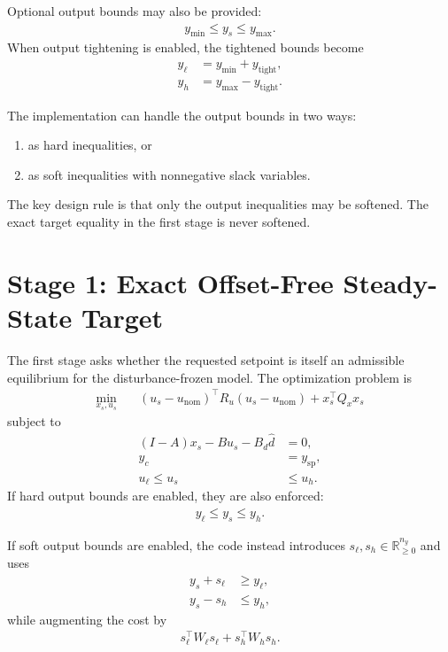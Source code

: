 \documentclass[11pt]{article}
\newcommand{\R}{\mathbb{R}}
\newcommand{\xs}{x_s}
\newcommand{\us}{u_s}
\newcommand{\ysp}{y_{\mathrm{sp}}}
\newcommand{\yexpr}{y_s}
\newcommand{\yctrl}{y_c}
\newcommand{\dhat}{\hat d}
\begin{document}
Optional output bounds may also be provided:
\begin{align}
    y_{\min} \le \yexpr \le y_{\max}.
\end{align}
When output tightening is enabled, the tightened bounds become
\begin{align}
    y_{\ell} &= y_{\min} + y_{\mathrm{tight}}, \\
    y_h &= y_{\max} - y_{\mathrm{tight}}.
\end{align}

The implementation can handle the output bounds in two ways:
\begin{enumerate}[label=\alph*)]
    \item as hard inequalities, or
    \item as soft inequalities with nonnegative slack variables.
\end{enumerate}
The key design rule is that only the output inequalities may be softened. The
exact target equality in the first stage is never softened.

\section{Stage 1: Exact Offset-Free Steady-State Target}
The first stage asks whether the requested setpoint is itself an admissible
equilibrium for the disturbance-frozen model. The optimization problem is
\begin{align}
    \min_{\xs,\us} \quad
    & (\us-u_{\mathrm{nom}})^\top R_u (\us-u_{\mathrm{nom}})
    + \xs^\top Q_x \xs
    \label{eq:stage1_cost}
\end{align}
subject to
\begin{align}
    (I-A)\xs - B\us - B_d \dhat &= 0, \label{eq:stage1_dyn} \\
    \yctrl &= \ysp, \label{eq:stage1_eq} \\
    u_{\ell} \le \us &\le u_h. \label{eq:stage1_input_bounds}
\end{align}
If hard output bounds are enabled, they are also enforced:
\begin{align}
    y_{\ell} \le \yexpr \le y_h.
\end{align}

If soft output bounds are enabled, the code instead introduces
$s_{\ell}, s_h \in \R^{n_y}_{\ge 0}$ and uses
\begin{align}
    \yexpr + s_{\ell} &\ge y_{\ell}, \\
    \yexpr - s_h &\le y_h,
\end{align}
while augmenting the cost by
\begin{align}
    s_{\ell}^\top W_{\ell} s_{\ell}
    + s_h^\top W_h s_h.
\end{align}
\end{document}
